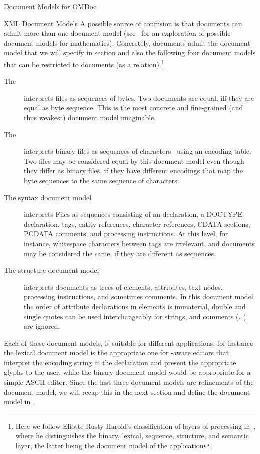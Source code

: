 \begin{tchapter}[id=document-model]{Document Models for OMDoc}
\begin{tsection}[id=xml-DOM]{XML Document Models}
A possible source of confusion is that documents can admit more than one document model
(see~\cite{KohKoh:aesmk05} for an exploration of possible document models for
mathematics). Concretely, {\omdoc} documents admit the {\omdoc} document model that we
will specify in section {} and also the following four {\xml} document
models that can be restricted to {\omdoc} documents (as a relation).\footnote{Here we
  follow Eliotte Rusty Harold's classification of layers of {\xml} processing
  in~\cite{Harold:ex03}, where he distinguishes the binary, lexical, sequence, structure,
  and semantic layer, the latter being the document model of the {\xml} application}
\begin{description}
\item[The {}] interprets files as sequences of
  bytes.  Two documents are equal, iff they are equal as byte sequence. This
  is the most concrete and fine-grained (and thus weakest) document model
  imaginable.
\item[The {}] interprets binary files as sequences of
  {} characters~\cite{Unicode:tuc03} using an encoding table.  Two files
  may be considered equal by this document model even though they differ as binary files,
  if they have different encodings that map the byte sequences to the same sequence of
  {\unicode} characters.
\item[The {\xml} syntax document model] interprets
  {\unicode} Files as sequences consisting of an {\xml} declaration, a DOCTYPE
  declaration, tags, entity references, character references, CDATA sections, PCDATA
  comments, and processing instructions. At this level, for instance, whitespace
  characters between {\xml} tags are irrelevant, and {\xml} documents may be considered
  the same, if they are different as {\unicode} sequences.
\item[The {\xml} structure document model]
  interprets documents as {\xml} trees of elements, attributes, text nodes, processing
  instructions, and sometimes comments. In this document model the order of attribute
  declarations in {\xml} elements is immaterial, double and single quotes can be used
  interchangeably for strings, and {\xml} comments
  (\ldots\snippetin{-->}) are ignored.
\end{description}
Each of these document models, is suitable for different applications, for instance the
lexical document model is the appropriate one for {}-aware editors that
interpret the encoding string in the {\xml} declaration and present the appropriate glyphs
to the user, while the binary document model would be appropriate for a simple ASCII
editor. Since the last three document models are refinements of the {\xml} document model,
we will recap this in the next section and define the {\omdoc} document model in
{}.


\end{tsection}
\end{tchapter}
